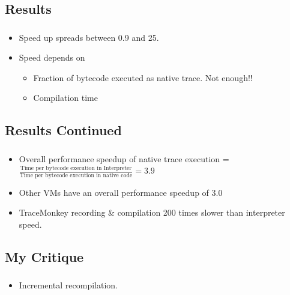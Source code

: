 \documentclass[mathserif,10pt]{beamer}
\newcommand{\cmt}[1]{}
\begin{document}
\subsection{Results}
\frame
{
  \frametitle{\subsecname}
  \begin{itemize}
    \item Speed up spreads between 0.9 and 25. 
    \item Speed depends on
    \begin{itemize}
      \item Fraction of bytecode executed as native trace. Not enough!!
      \item Compilation time
    \end{itemize}
  \end{itemize}
}

\subsection{Results Continued}
\frame
{
  \frametitle{\subsecname}
  \begin{itemize}
    \item Overall performance speedup of native trace execution  = $\frac{\text{Time per bytecode execution in Interpreter}}{\text{Time per bytecode execution in native code}  } = 3.9$
      \cmt{
    \item Native trace takes 9 cycles/ byte code as compared to the interpreter ( 35 cycle/ bytecode) 
      }
    \item Other VMs have an overall performance speedup of 3.0
    \item TraceMonkey recording \& compilation 200 times slower than interpreter speed.
  \end{itemize}
}
\subsection{My Critique}
\frame
{
  \frametitle{\subsecname}
  \begin{itemize}
  \cmt{
    \item Web as Desktop
      In short, plenty. JavaScript has become a predominant technology amongst today's web developers, and Mozilla—along with pretty much every web browser maker out there—aims to make it just as fast as code that runs on your desktop. The closer everyone gets to that kind of speed, the closer the idea of the Web as Desktop gets to reality. This is handily demonstrated in a video demonstration of online photo editing over at Mozilla's site. With just-in-time compiling, actions the user takes on a web program move along as if being adjusted in a desktop app, as opposed to having to basically re-load an entire JavaScript app and figure out what state it's in.}
    \item Incremental recompilation.
  \end{itemize}
}
\end{document}
